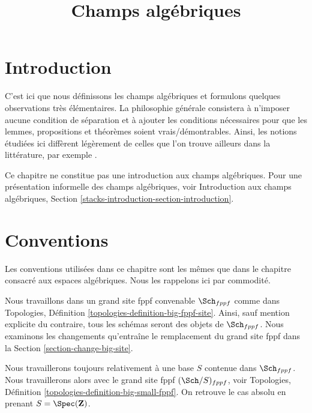

%


\title{Champs algébriques}


\maketitle

\label{section-phantom}

\tableofcontents

\section{Introduction}
\label{section-introduction}

\noindent
C'est ici que nous définissons les champs algébriques et formulons quelques
observations très élémentaires. La philosophie générale consistera à n'imposer
aucune condition de séparation et à ajouter les conditions nécessaires pour que
les lemmes, propositions et théorèmes soient vrais/démontrables. Ainsi, les notions
étudiées ici diffèrent légèrement de celles que l'on trouve ailleurs dans la littérature, par exemple
\cite{LM-B}.

\medskip\noindent
Ce chapitre ne constitue pas une introduction aux champs algébriques.
Pour une présentation informelle des champs algébriques, voir
Introduction aux champs algébriques, Section
\ref{stacks-introduction-section-introduction}.


\section{Conventions}
\label{section-conventions}

\noindent
Les conventions utilisées dans ce chapitre sont les mêmes que dans le
chapitre consacré aux espaces algébriques. Nous les rappelons ici par commodité.

\medskip\noindent
Nous travaillons dans un grand site fppf convenable $\Sch_{fppf}$
comme dans Topologies, Définition \ref{topologies-definition-big-fppf-site}.
Ainsi, sauf mention explicite du contraire, tous les schémas seront des objets
de $\Sch_{fppf}$. Nous examinons les changements qu'entraîne le remplacement du grand
site fppf dans la
Section \ref{section-change-big-site}.

\medskip\noindent
Nous travaillerons toujours relativement à une base $S$ contenue dans $\Sch_{fppf}$.
Nous travaillerons alors avec le grand site fppf $(\Sch/S)_{fppf}$, voir
Topologies, Définition \ref{topologies-definition-big-small-fppf}.
On retrouve le cas absolu en prenant
$S = \Spec(\mathbf{Z})$.

